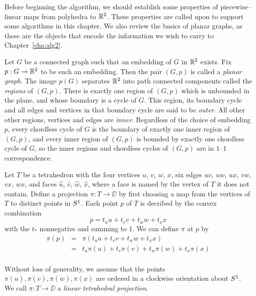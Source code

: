 \label{alg:proj}
Before beginning the algorithm, we should establish some properties of piecewise--linear maps from polyhedra to $\mathbb{R}^2$.
These properties are called upon to support some algorithms in this chapter.
We also review the basics of planar graphs, as these are the objects that encode the information we wish to carry to Chapter~\ref{cha:alg2}.

\begin{defn}
Let $G$ be a connected graph such that an embedding of $G$ in $\mathbb{R}^2$ exists.
Fix $p:G\to\mathbb{R}^2$ to be such an embedding.
Then the pair $(G,p)$ is called a \emph{planar graph}.
The image $p(G)$ separates $\mathbb{R}^2$ into path connected components called the \emph{regions} of $(G,p)$.
There is exactly one region of $(G,p)$ which is unbounded in the plane, and whose boundary is a cycle of $G$.
This region, its boundary cycle and all edges and vertices in that boundary cycle are said to be \emph{outer}.
All other other regions, vertices and edges are \emph{inner}.
Regardless of the choice of embedding $p$, every chordless cycle of $G$ is the boundary of exactly one inner region of $(G,p)$, and every inner region of $(G,p)$ is bounded by exactly one chordless cycle of $G$, so the inner regions and chordless cycles of $(G,p)$ are in $1$--$1$ correspondence.
\end{defn}

\begin{defn}
\label{def:stdproj}
Let $T$ be a tetrahedron with the four vertices $u$, $v$, $w$, $x$, six edges $uv$, $uw$, $ux$, $vw$, $vx$, $wx$, and faces $\hat{u}$, $\hat{v}$, $\hat{w}$, $\hat{x}$, where a face is named by the vertex of $T$ it does not contain.
Define a projection $\pi: T \to\DD$ by first choosing a map from the vertices of $T$ to distinct points in $S^1$.
Each point $p$ of $T$ is decribed by the convex combination
\[
  p = t_u u + t_v v + t_w w + t_x x
\]
with the $t_*$ nonnegative and summing to 1.
We can define $\pi$ at $p$ by
\begin{eqnarray*}
  \pi(p)
  &=&
  \pi(t_u u + t_v v + t_w w + t_x x)\\
  &=&
  t_u \pi(u) + t_v \pi(v) + t_w \pi(w) + t_x \pi(x)\\
\end{eqnarray*}
  
Without loss of generality, we assume that the points $\pi(u),\pi(v),\pi(w),\pi(x)$ are ordered in a clockwise orientation about $S^1$.
We call $\pi:T\to\DD$ a \emph{linear tetrahedral projection}.
\end{defn}

